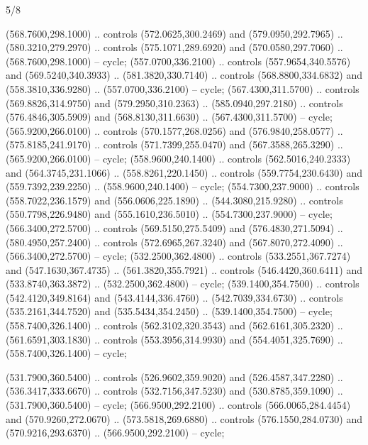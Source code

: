 \begin{flagdescription}{5/8}
\begin{scope}[shift={(0.5\flaglength,0.5\flagwidth)},scale=\flagwidth*\stretchfactor/820]
\begin{scope}[scale=1.84,xshift=-135mm,yshift=84mm]
\begin{scope}[y=0.80pt, x=0.80pt, yscale=-1, xscale=1]
\begin{scope}[cm={{1.01416,0.0,0.0,1.033,(-6.79641,-9.89449)}}]
\begin{scope}[draw=c24420e]
\begin{scope}[line width=0.131\lw]
\begin{scope}[fill=c406325]
 (568.7600,298.1000) .. controls (572.0625,300.2469) and
  (579.0950,292.7965) .. (580.3210,279.2970) .. controls (575.1071,289.6920) and
  (570.0580,297.7060) .. (568.7600,298.1000) -- cycle;
 (557.0700,336.2100) .. controls (557.9654,340.5576) and
  (569.5240,340.3933) .. (581.3820,330.7140) .. controls (568.8800,334.6832) and
  (558.3810,336.9280) .. (557.0700,336.2100) -- cycle;
 (567.4300,311.5700) .. controls (569.8826,314.9750) and
  (579.2950,310.2363) .. (585.0940,297.2180) .. controls (576.4846,305.5909) and
  (568.8130,311.6630) .. (567.4300,311.5700) -- cycle;
 (565.9200,266.0100) .. controls (570.1577,268.0256) and
  (576.9840,258.0577) .. (575.8185,241.9170) .. controls (571.7399,255.0470) and
  (567.3588,265.3290) .. (565.9200,266.0100) -- cycle;
 (558.9600,240.1400) .. controls (562.5016,240.2333) and
  (564.3745,231.1066) .. (558.8261,220.1450) .. controls (559.7754,230.6430) and
  (559.7392,239.2250) .. (558.9600,240.1400) -- cycle;
 (554.7300,237.9000) .. controls (558.7022,236.1579) and
  (556.0606,225.1890) .. (544.3080,215.9280) .. controls (550.7798,226.9480) and
  (555.1610,236.5010) .. (554.7300,237.9000) -- cycle;
 (566.3400,272.5700) .. controls (569.5150,275.5409) and
  (576.4830,271.5094) .. (580.4950,257.2400) .. controls (572.6965,267.3240) and
  (567.8070,272.4090) .. (566.3400,272.5700) -- cycle;
 (532.2500,362.4800) .. controls (533.2551,367.7274) and
  (547.1630,367.4735) .. (561.3820,355.7921) .. controls (546.4420,360.6411) and
  (533.8740,363.3872) .. (532.2500,362.4800) -- cycle;
 (539.1400,354.7500) .. controls (542.4120,349.8164) and
  (543.4144,336.4760) .. (542.7039,334.6730) .. controls (535.2161,344.7520) and
  (535.5434,354.2450) .. (539.1400,354.7500) -- cycle;
 (558.7400,326.1400) .. controls (562.3102,320.3543) and
  (562.6161,305.2320) .. (561.6591,303.1830) .. controls (553.3956,314.9930) and
  (554.4051,325.7690) .. (558.7400,326.1400) -- cycle;
\end{scope}
\begin{scope}[fill=c67923d]
 (531.7900,360.5400) .. controls (526.9602,359.9020) and
  (526.4587,347.2280) .. (536.3417,333.6670) .. controls (532.7156,347.5230) and
  (530.8785,359.1090) .. (531.7900,360.5400) -- cycle;
 (566.9500,292.2100) .. controls (566.0065,284.4454) and
  (570.9260,272.0670) .. (573.5818,269.6880) .. controls (576.1550,284.0730) and
  (570.9216,293.6370) .. (566.9500,292.2100) -- cycle;

\end{scope}
\end{scope}
\end{scope}
\end{scope}
\end{scope}
\end{scope}
\end{scope}
\end{flagdescription}
